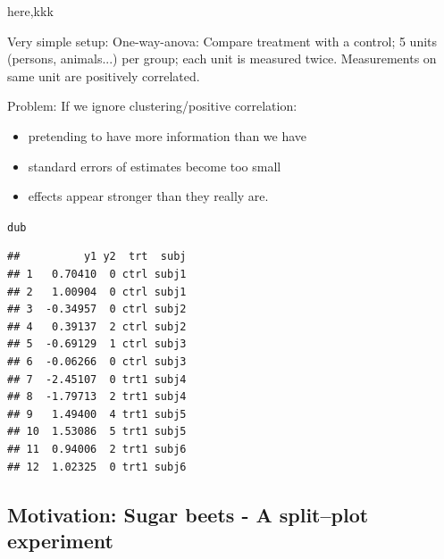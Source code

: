 \documentclass[compress]{beamer}\usepackage[]{graphicx}\usepackage[]{color}
\makeatletter
\newcommand{\hlstd}[1]{\textcolor[rgb]{0.345,0.345,0.345}{#1}}%
\newenvironment{kframe}{%
 \def\at@end@of@kframe{}%
 \ifinner\ifhmode%
  \def\at@end@of@kframe{\end{minipage}}%
  \begin{minipage}{\columnwidth}%
 \fi\fi%
 \def\FrameCommand##1{\hskip\@totalleftmargin \hskip-\fboxsep
 \colorbox{shadecolor}{##1}\hskip-\fboxsep
     \hskip-\linewidth \hskip-\@totalleftmargin \hskip\columnwidth}%
 \MakeFramed {\advance\hsize-\width
   \@totalleftmargin\z@ \linewidth\hsize
   \@setminipage}}%
 {\par\unskip\endMakeFramed%
 \at@end@of@kframe}
\newenvironment{knitrout}{}{} %
\makeatother
\begin{document}
\begin{frame}
  {here,kkk}

  
  Very simple setup: One-way-anova: Compare treatment with a control; 5
units (persons, animals...) per group; each unit is measured
twice. Measurements on same unit are positively correlated.

Problem: If we ignore  clustering/positive correlation:
\begin{itemize}
\item pretending to have
  more information than we have
  
\item standard errors of estimates become
  too small 
\item effects appear stronger than they really are.
\end{itemize}



\begin{knitrout}\scriptsize
{}\color{fgcolor}\begin{kframe}
\begin{alltt}
\hlstd{dub}
\end{alltt}
\begin{verbatim}
##          y1 y2  trt  subj
## 1   0.70410  0 ctrl subj1
## 2   1.00904  0 ctrl subj1
## 3  -0.34957  0 ctrl subj2
## 4   0.39137  2 ctrl subj2
## 5  -0.69129  1 ctrl subj3
## 6  -0.06266  0 ctrl subj3
## 7  -2.45107  0 trt1 subj4
## 8  -1.79713  2 trt1 subj4
## 9   1.49400  4 trt1 subj5
## 10  1.53086  5 trt1 subj5
## 11  0.94006  2 trt1 subj6
## 12  1.02325  0 trt1 subj6
\end{verbatim}
\end{kframe}
\end{knitrout}



\end{frame}








\subsection{Motivation: Sugar beets - A split--plot experiment}
\label{sec:xxx}
\end{document}
